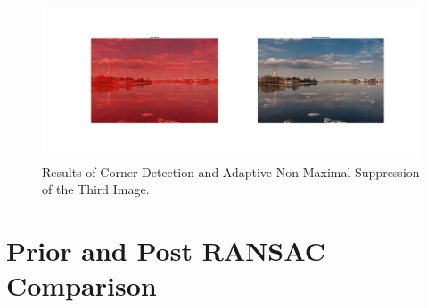 \documentclass[english]{article}
\begin{document}
\begin{enumerate}
\begin{figure}[H]
          \centering
          \includegraphics[width=1\textwidth]{img3.jpg}
          \caption{Results of Corner Detection and Adaptive Non-Maximal Suppression of the Third Image.}
          \label{fig:img3}
        \end{figure}
\end{enumerate}
\section{Prior and Post RANSAC Comparison}
\end{document}
